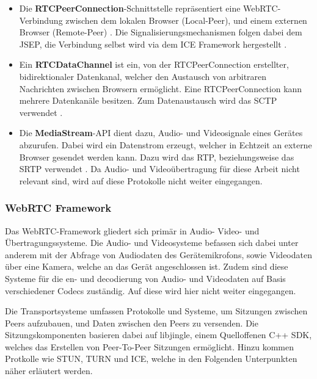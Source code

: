 \begin{itemize}
  \item Die \textbf{RTCPeerConnection}-Schnittstelle repräsentiert eine WebRTC-Verbindung zwischen dem lokalen Browser (Local-Peer), und einem externen Browser (Remote-Peer) \cite{rtcpeerconnection}. Die Signalisierungsmechanismen folgen dabei dem \ac{JSEP}, die Verbindung selbst wird via dem \ac{ICE} Framework hergestellt \cite{loreto2014}.
  
  \item Ein \textbf{RTCDataChannel} ist ein, von der RTCPeerConnection erstellter, bidirektionaler Datenkanal, welcher den Austausch von arbitraren Nachrichten zwischen Browsern ermöglicht. Eine RTCPeerConnection kann mehrere Datenkanäle besitzen. Zum Datenaustausch wird das \ac{SCTP} verwendet \cite{loreto2014, rtcpeerconnection}.
  
  \item Die \textbf{MediaStream}-\acs{API} dient dazu, Audio- und Videosignale eines Gerätes abzurufen. Dabei wird ein Datenstrom erzeugt, welcher in Echtzeit an externe Browser gesendet werden kann. Dazu wird das \ac{RTP}, beziehungsweise das \ac{SRTP} verwendet \cite{loreto2014}. Da Audio- und Videoübertragung für diese Arbeit nicht relevant sind, wird auf diese Protokolle nicht weiter eingegangen.
\end{itemize}

\subsubsection*{WebRTC Framework}
Das \acs{WebRTC}-Framework gliedert sich primär in Audio- Video- und Übertragungssysteme. Die Audio- und Videosysteme befassen sich dabei unter anderem mit der Abfrage von Audiodaten des Gerätemikrofons, sowie Videodaten über eine Kamera, welche an das Gerät angeschlossen ist. Zudem sind diese Systeme für die en- und decodierung von Audio- und Videodaten auf Basis verschiedener \glqq{}Codecs\grqq{} zuständig. Auf diese wird hier nicht weiter eingegangen.\par

Die Transportsysteme umfassen Protokolle und Systeme, um Sitzungen zwischen Peers aufzubauen, und Daten zwischen den Peers zu versenden. Die Sitzungskomponenten basieren dabei auf \glqq{}libjingle\grqq{}, einem Quelloffenen C++ \ac{SDK}, welches das Erstellen von Peer-To-Peer Sitzungen ermöglicht. Hinzu kommen Protkolle wie \acs{STUN}, \acs{TURN} und \acs{ICE}, welche in den Folgenden Unterpunkten näher erläutert werden.


